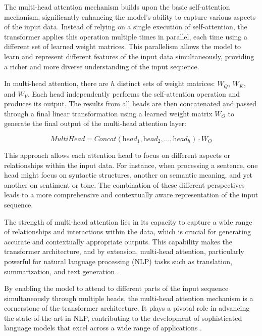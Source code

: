 The multi-head attention mechanism builds upon the basic self-attention mechanism, significantly enhancing the model's ability to capture various aspects of the input data. Instead of relying on a single execution of self-attention, the transformer applies this operation multiple times in parallel, each time using a different set of learned weight matrices. This parallelism allows the model to learn and represent different features of the input data simultaneously, providing a richer and more diverse understanding of the input sequence.

In multi-head attention, there are \( h \) distinct sets of weight matrices: \( W_Q \), \( W_K \), and \( W_V \). Each head independently performs the self-attention operation and produces its output. The results from all heads are then concatenated and passed through a final linear transformation using a learned weight matrix \( W_O \) to generate the final output of the multi-head attention layer:

\begin{equation}
    \textit{MultiHead} = \textit{Concat}(\textit{head}_1, \textit{head}_2, \ldots, \textit{head}_h) \cdot W_O
\end{equation}

This approach allows each attention head to focus on different aspects or relationships within the input data. For instance, when processing a sentence, one head might focus on syntactic structures, another on semantic meaning, and yet another on sentiment or tone. The combination of these different perspectives leads to a more comprehensive and contextually aware representation of the input sequence.

The strength of multi-head attention lies in its capacity to capture a wide range of relationships and interactions within the data, which is crucial for generating accurate and contextually appropriate outputs. This capability makes the transformer architecture, and by extension, multi-head attention, particularly powerful for natural language processing (NLP) tasks such as translation, summarization, and text generation \cite{geeksforgeeks2024-sa}.

By enabling the model to attend to different parts of the input sequence simultaneously through multiple heads, the multi-head attention mechanism is a cornerstone of the transformer architecture. It plays a pivotal role in advancing the state-of-the-art in NLP, contributing to the development of sophisticated language models that excel across a wide range of applications \cite{vaswani2017attention}.

